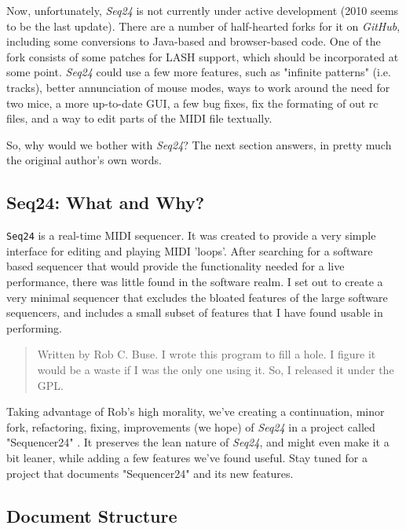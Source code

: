\documentclass[
 11pt,
 twoside,
 a4paper,
 headinclude,
 footinclude,
 final                                 %
]{article}
\begin{document}
   Now, unfortunately, \textsl{Seq24} is not currently under active
   development (2010 seems to be the last update).  There are a number of
   half-hearted forks for it on \textsl{GitHub}, including some conversions
   to Java-based and browser-based code.  One of the fork consists of some
   patches for LASH support, which should be incorporated at some point.
   \textsl{Seq24} could use a few more features, such as "infinite
   patterns" (i.e. tracks), better annunciation of mouse modes,
   ways to work around the need for two mice, a more up-to-date GUI,
   a few bug fixes, fix the formating of out rc files,
   and a way to edit parts of the MIDI file textually.

   So, why would we bother with \textsl{Seq24}?  The next section answers,
   in pretty much the original author's own words.

\subsection{Seq24: What and Why?}
\label{subsec:introduction_seq24_vs_others}

   \texttt{Seq24} is a real-time MIDI sequencer. It was created to 
   provide a very simple interface for editing and playing 
   MIDI 'loops'. After searching for a software based 
   sequencer that would provide the functionality needed for 
   a live performance, there was little found in the 
   software realm. I set out to create a very minimal sequencer 
   that excludes the bloated features of the large software 
   sequencers, and includes a small subset of features that 
   I have found usable in performing. 

   \begin{quotation}
      Written by Rob C. Buse.  I wrote this program to fill a
      hole.  I figure it would be a waste if I was the only one
      using it.  So, I released it under the GPL.
   \end{quotation}

   Taking advantage of Rob's high morality, we've creating a continuation,
   minor fork, refactoring, fixing, improvements (we hope) of \textsl{Seq24}
   in a project called "Sequencer24" \cite{sequencer24}.  It preserves the
   lean nature of \textsl{Seq24}, and might even make it a bit leaner, while
   adding a few features we've found useful.  Stay tuned for a project that
   documents "Sequencer24" and its new features.

\subsection{Document Structure}
\label{subsec:introduction_document_structure}
\end{document}
